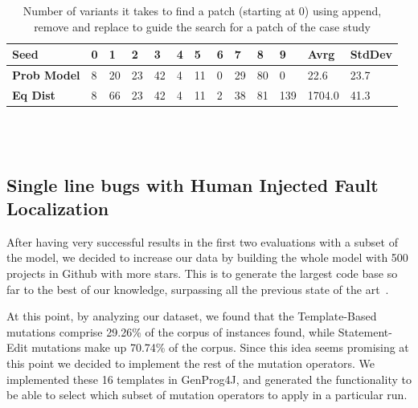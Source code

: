 \documentclass[conference]{IEEEtran}
\begin{document}
\begin{table}[ht]
\begin{tabular}{lR{0.1cm}R{0.1cm}R{0.1cm}R{0.1cm}R{0.1cm}R{0.1cm}R{0.1cm}R{0.1cm}R{0.1cm}R{0.1cm}R{0.5cm}R{0.5cm}}
\hline
\textbf{Seed} & \textbf{0} & \textbf{1} & \textbf{2} & \textbf{3} & \textbf{4} & \textbf{5} & \textbf{6} & \textbf{7} & \textbf{8} & \textbf{9}  & Avrg & StdDev  \\
\hline
\textbf{Prob Model} & 8 & 20 & 23 & 42 & 4 & 11 & 0 & 29 & 80 & 0  & 22.6 & 23.7\\

\textbf{Eq Dist} & 8 & 66 & 23 & 42 & 4 & 11 & 2 & 38 & 81 & 139 & 1704.0 & 41.3 \\
\hline
\end{tabular}
\\
\\
  \caption{Number of variants it takes to find a patch (starting at 0) using append, remove and replace to guide the search for a patch of 
the case study}
  \label{fig:resultsARR}
\end{table} 

\subsection{Single line bugs with Human Injected Fault Localization}
After having very successful results in the first two evaluations with a subset of the model, we decided 
to increase our data by building the whole model with 500 projects in Github with more 
stars. This is to generate the largest code base so far to the best 
of our knowledge, surpassing all the previous state of the 
art~\cite{long15,Soto15,zhong15,matias15,xuan16}. 

At this point, by analyzing our dataset, 
we found that the Template-Based mutations comprise 29.26\% of the corpus of 
instances found, while Statement-Edit mutations make up 70.74\% of the 
corpus. Since this idea seems promising at this point we decided to implement the rest 
of the mutation operators. We implemented these 16 templates in GenProg4J, and generated the functionality 
to be able to select which subset of mutation operators to apply in a particular 
run.
\end{document}
